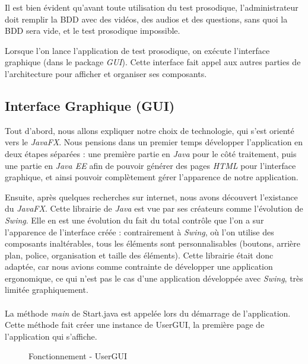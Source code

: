 Il est bien évident qu'avant toute utilisation du test prosodique, l'administrateur doit remplir la BDD avec des vidéos, des audios et des questions, sans quoi la BDD sera vide, et le test prosodique impossible.

Lorsque l'on lance l'application de test prosodique, on exécute l'interface graphique (dans le package \textit{GUI}). Cette interface fait appel aux autres parties de l'architecture pour afficher et organiser ses composants.

\subsection{Interface Graphique (GUI)}\label{GUI}

Tout d'abord, nous allons expliquer notre choix de technologie, qui s'est orienté vers le \textit{JavaFX}.
Nous pensions dans un premier temps développer l'application en deux étapes séparées : une première partie en \textit{Java} pour le côté traitement, puis une partie en \textit{Java EE} afin de pouvoir générer des pages \textit{HTML} pour l'interface graphique, et ainsi pouvoir complètement gérer l'apparence de notre application. 

Ensuite, après quelques recherches sur internet, nous avons découvert l'existance du \textit{JavaFX}.
Cette librairie de \textit{Java} est vue par ses créateurs comme l'évolution de \textit{Swing}.
Elle en est une évolution du fait du total contrôle que l'on a sur l'apparence de l'interface créée : contrairement à \textit{Swing}, où l'on utilise des composants inaltérables, tous les éléments sont personnalisables (boutons, arrière plan, police, organisation et taille des éléments).
Cette librairie était donc adaptée, car nous avions comme contrainte de développer une application ergonomique, ce qui n'est pas le cas d'une application développée avec \textit{Swing}, très limitée graphiquement.\\
\\


La méthode \textit{main} de Start.java est appelée lors du démarrage de l'application. Cette méthode fait créer une instance de UserGUI, la première page de l'application qui s'affiche.

\begin{figure}[!ht]
\begin{center}
  \caption{Fonctionnement - UserGUI}
  \label{UserGUI} 
\end{center}
\end{figure}

